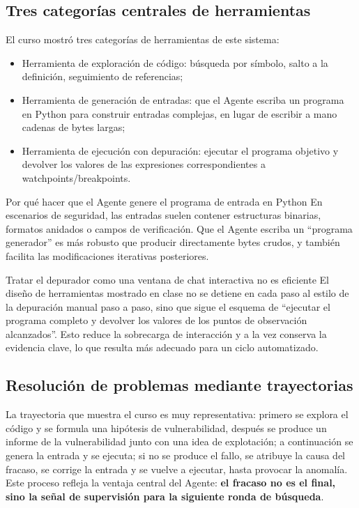 \documentclass[a4paper]{article}
\begin{document}
\subsection{Tres categorías centrales de herramientas}
El curso mostró tres categorías de herramientas de este sistema:
\begin{itemize}
    \item Herramienta de exploración de código: búsqueda por símbolo, salto a la definición, seguimiento de referencias;
    \item Herramienta de generación de entradas: que el Agente escriba un programa en Python para construir entradas complejas, en lugar de escribir a mano cadenas de bytes largas;
    \item Herramienta de ejecución con depuración: ejecutar el programa objetivo y devolver los valores de las expresiones correspondientes a watchpoints/breakpoints.
\end{itemize}

\begin{knowledgebox}{Por qué hacer que el Agente genere el programa de entrada en Python}
En escenarios de seguridad, las entradas suelen contener estructuras binarias, formatos anidados o campos de verificación. Que el Agente escriba un ``programa generador'' es más robusto que producir directamente bytes crudos, y también facilita las modificaciones iterativas posteriores.
\end{knowledgebox}

\begin{warningbox}{Tratar el depurador como una ventana de chat interactiva no es eficiente}
El diseño de herramientas mostrado en clase no se detiene en cada paso al estilo de la depuración manual paso a paso, sino que sigue el esquema de ``ejecutar el programa completo y devolver los valores de los puntos de observación alcanzados''. Esto reduce la sobrecarga de interacción y a la vez conserva la evidencia clave, lo que resulta más adecuado para un ciclo automatizado.
\end{warningbox}

\subsection{Resolución de problemas mediante trayectorias}
La trayectoria que muestra el curso es muy representativa: primero se explora el código y se formula una hipótesis de vulnerabilidad, después se produce un informe de la vulnerabilidad junto con una idea de explotación; a continuación se genera la entrada y se ejecuta; si no se produce el fallo, se atribuye la causa del fracaso, se corrige la entrada y se vuelve a ejecutar, hasta provocar la anomalía. Este proceso refleja la ventaja central del Agente: \textbf{el fracaso no es el final, sino la señal de supervisión para la siguiente ronda de búsqueda}.
\end{document}
